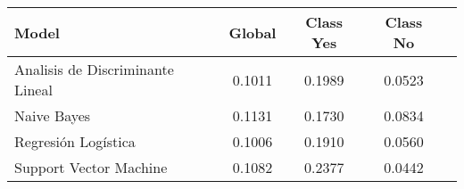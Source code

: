 \begin{tabular}{p{3cm}|c|c|c|c}
\toprule
                            Model &  Global &  Class Yes &  Class No \\
\midrule
 Analisis de Discriminante Lineal &  0.1011 &     0.1989 &    0.0523 \\
                      Naive Bayes &  0.1131 &     0.1730 &    0.0834 \\
              Regresión Logística &  0.1006 &     0.1910 &    0.0560 \\
           Support Vector Machine &  0.1082 &     0.2377 &    0.0442 \\
\bottomrule
\end{tabular}
